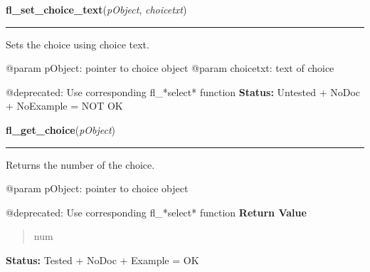     \vspace{0.5ex}

\hspace{.8\funcindent}\begin{boxedminipage}{\funcwidth}

    \raggedright \textbf{fl\_set\_choice\_text}(\textit{pObject}, \textit{choicetxt})

    \vspace{-1.5ex}

    \rule{\textwidth}{0.5\fboxrule}
\setlength{\parskip}{2ex}

Sets the choice using choice text.

@param pObject: pointer to choice object
@param choicetxt: text of choice

@deprecated: Use corresponding fl\_*select* function
\setlength{\parskip}{1ex}
\textbf{Status:} 
Untested + NoDoc + NoExample = NOT OK


    \end{boxedminipage}

    \label{xformslib:deprecated:fl_get_choice}

    \vspace{0.5ex}

\hspace{.8\funcindent}\begin{boxedminipage}{\funcwidth}

    \raggedright \textbf{fl\_get\_choice}(\textit{pObject})

    \vspace{-1.5ex}

    \rule{\textwidth}{0.5\fboxrule}
\setlength{\parskip}{2ex}

Returns the number of the choice.

@param pObject: pointer to choice object

@deprecated: Use corresponding fl\_*select* function
\setlength{\parskip}{1ex}
      \textbf{Return Value}
    \vspace{-1ex}

      \begin{quote}

num
      \end{quote}

\textbf{Status:} 
Tested + NoDoc + Example = OK


    \end{boxedminipage}

